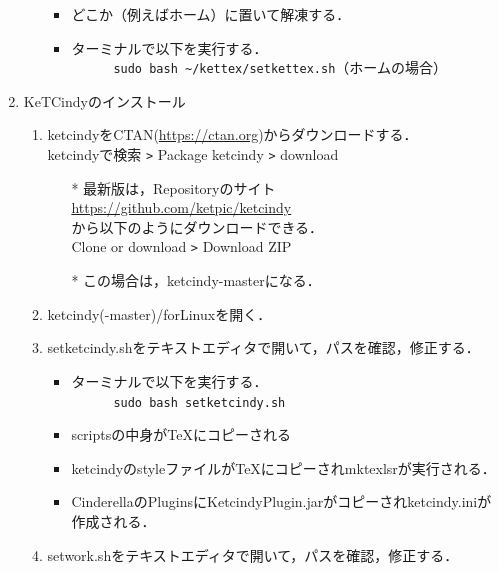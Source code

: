 \documentclass{ujarticle}
\begin{document}
\begin{enumerate}[\bf\large 1.]
\begin{enumerate}[(1)]
    \begin{itemize}
    \item どこか（例えばホーム）に置いて解凍する．
    \item ターミナルで以下を実行する．\\
　　　\verb|sudo bash ~/kettex/setkettex.sh|（ホームの場合）
    \end{itemize}

 \end{enumerate}

\item KeTCindyのインストール
  \begin{enumerate}[(1)]
  \item ketcindyをCTAN(\url{https://ctan.org})からダウンロードする．\\
  \hspace*{10mm}ketcindyで検索 \verb|>| Package ketcindy \verb|>| download
    \begin{itemize}
    \item[*]最新版は，Repositoryのサイト\\
        \hspace*{10mm}\url{https://github.com/ket­pic/ketcindy}\\
       から以下のようにダウンロードできる．\\
        \hspace*{10mm}Clone or download \verb|>| Download ZIP
    \item[*]この場合は，ketcindy-masterになる．
    \end{itemize}
  \item ketcindy(-master)/forLinuxを開く．
  \item setketcindy.shをテキストエディタで開いて，パスを確認，修正する．
    \begin{itemize}
    \item ターミナルで以下を実行する．\\
　　　\verb|sudo bash setketcindy.sh|
    \item scriptsの中身が\TeX にコピーされる
    \item ketcindyのstyleファイルが\TeX にコピーされmktexlsrが実行される．
    \item CinderellaのPluginsにKetcindyPlugin.jarがコピーされketcindy.iniが作成される．
    \end{itemize}
  \item setwork.shをテキストエディタで開いて，パスを確認，修正する．
    \begin{itemize}

\end{itemize}
\end{enumerate}
\end{enumerate}
\end{document}

